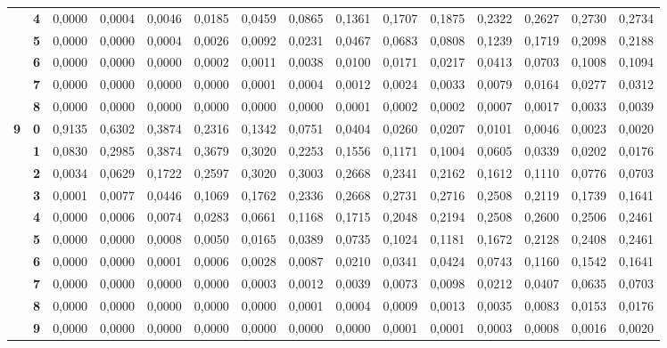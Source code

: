 \documentclass[11pt,a4paper]{article}
\begin{document}
\begin{center}
\begin{tabular}{cc|ccccccccccccc}
 & \textbf{4} & 0,0000 & 0,0004 & 0,0046 & 0,0185 & 0,0459 & 0,0865 & 0,1361 & 0,1707 & 0,1875 & 0,2322 & 0,2627 & 0,2730 & 0,2734\\
 & \textbf{5} & 0,0000 & 0,0000 & 0,0004 & 0,0026 & 0,0092 & 0,0231 & 0,0467 & 0,0683 & 0,0808 & 0,1239 & 0,1719 & 0,2098 & 0,2188\\
 & \textbf{6} & 0,0000 & 0,0000 & 0,0000 & 0,0002 & 0,0011 & 0,0038 & 0,0100 & 0,0171 & 0,0217 & 0,0413 & 0,0703 & 0,1008 & 0,1094\\
 & \textbf{7} & 0,0000 & 0,0000 & 0,0000 & 0,0000 & 0,0001 & 0,0004 & 0,0012 & 0,0024 & 0,0033 & 0,0079 & 0,0164 & 0,0277 & 0,0312\\
 & \textbf{8} & 0,0000 & 0,0000 & 0,0000 & 0,0000 & 0,0000 & 0,0000 & 0,0001 & 0,0002 & 0,0002 & 0,0007 & 0,0017 & 0,0033 & 0,0039\\
\midrule
\multirow{10}{*}{\textbf{9}} & \textbf{0} & 0,9135 & 0,6302 & 0,3874 & 0,2316 & 0,1342 & 0,0751 & 0,0404 & 0,0260 & 0,0207 & 0,0101 & 0,0046 & 0,0023 & 0,0020\\
 & \textbf{1} & 0,0830 & 0,2985 & 0,3874 & 0,3679 & 0,3020 & 0,2253 & 0,1556 & 0,1171 & 0,1004 & 0,0605 & 0,0339 & 0,0202 & 0,0176\\
 & \textbf{2} & 0,0034 & 0,0629 & 0,1722 & 0,2597 & 0,3020 & 0,3003 & 0,2668 & 0,2341 & 0,2162 & 0,1612 & 0,1110 & 0,0776 & 0,0703\\
 & \textbf{3} & 0,0001 & 0,0077 & 0,0446 & 0,1069 & 0,1762 & 0,2336 & 0,2668 & 0,2731 & 0,2716 & 0,2508 & 0,2119 & 0,1739 & 0,1641\\
 & \textbf{4} & 0,0000 & 0,0006 & 0,0074 & 0,0283 & 0,0661 & 0,1168 & 0,1715 & 0,2048 & 0,2194 & 0,2508 & 0,2600 & 0,2506 & 0,2461\\
 & \textbf{5} & 0,0000 & 0,0000 & 0,0008 & 0,0050 & 0,0165 & 0,0389 & 0,0735 & 0,1024 & 0,1181 & 0,1672 & 0,2128 & 0,2408 & 0,2461\\
 & \textbf{6} & 0,0000 & 0,0000 & 0,0001 & 0,0006 & 0,0028 & 0,0087 & 0,0210 & 0,0341 & 0,0424 & 0,0743 & 0,1160 & 0,1542 & 0,1641\\
 & \textbf{7} & 0,0000 & 0,0000 & 0,0000 & 0,0000 & 0,0003 & 0,0012 & 0,0039 & 0,0073 & 0,0098 & 0,0212 & 0,0407 & 0,0635 & 0,0703\\
 & \textbf{8} & 0,0000 & 0,0000 & 0,0000 & 0,0000 & 0,0000 & 0,0001 & 0,0004 & 0,0009 & 0,0013 & 0,0035 & 0,0083 & 0,0153 & 0,0176\\
 & \textbf{9} & 0,0000 & 0,0000 & 0,0000 & 0,0000 & 0,0000 & 0,0000 & 0,0000 & 0,0001 & 0,0001 & 0,0003 & 0,0008 & 0,0016 & 0,0020\\
\bottomrule\end{tabular}
\end{center}
\end{document}
